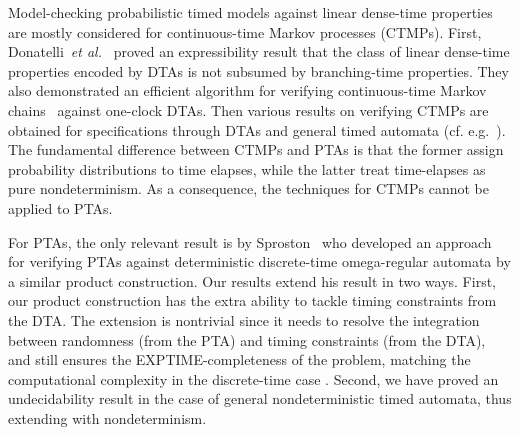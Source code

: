 Model-checking probabilistic timed models against linear dense-time properties
are mostly considered for continuous-time Markov processes (CTMPs).
First, Donatelli~\emph{et al.}~\cite{DBLP:journals/tse/DonatelliHS09} proved an expressibility result that the class of linear dense-time properties encoded by DTAs is not subsumed by branching-time properties.
They also demonstrated an efficient algorithm for verifying continuous-time Markov chains~\cite{DBLP:journals/tse/DonatelliHS09} against one-clock DTAs.
Then various results on verifying CTMPs are obtained for specifications through DTAs and general timed automata (cf. e.g.~\cite{DBLP:journals/tse/DonatelliHS09,DBLP:journals/corr/abs-1101-3694,DBLP:conf/hybrid/Fu13,DBLP:conf/hybrid/BrazdilKKKR11,DBLP:conf/tacas/BarbotCHKM11,DBLP:conf/formats/BortolussiL15}).
The fundamental difference between CTMPs and PTAs is that the former assign probability distributions to time elapses, while the latter treat time-elapses as pure nondeterminism.
As a consequence, the techniques for CTMPs cannot be applied to PTAs.

For PTAs, the only relevant result is by Sproston~\cite{DBLP:conf/qest/Sproston11} who developed an approach for verifying PTAs against deterministic discrete-time omega-regular automata by a similar product construction.
Our results extend his result in two ways.
First, our product construction has the extra ability to tackle timing constraints from the DTA.
The extension is nontrivial since it needs to resolve the integration between randomness (from the PTA) and timing constraints (from the DTA), and still ensures the EXPTIME-completeness of the problem, matching the computational complexity in the discrete-time case \cite{DBLP:conf/qest/Sproston11}.
Second, we have proved an undecidability result in the case of general nondeterministic timed automata, thus extending \cite{DBLP:conf/qest/Sproston11} with nondeterminism.



